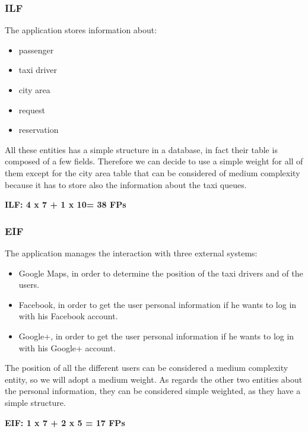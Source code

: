 		\subsubsection{ILF}
			The application stores information about:
			\begin{itemize}
				\item passenger
				\item taxi driver
				\item city area
				\item request
				\item reservation
			\end{itemize}
			All these entities has a simple structure in a database, in fact their table is composed of a few fields. Therefore we can decide to use a simple weight for all of them except for the city area table that can be considered of medium complexity because it has to store also the information about the taxi queues.
			\begin{center}
				\textbf{ILF: 4 x 7 + 1 x 10= 38 FPs}
			\end{center}
		\subsubsection{EIF}
			The application manages the interaction with three external systems:
			\begin{itemize}
				\item Google Maps, in order to determine the position of the taxi drivers and of the users.
				\item Facebook, in order to get the user personal information if he wants to log in with his Facebook account.
				\item Google+, in  order to get the user personal information if he wants to log in with his Google+ account.
			\end{itemize}
			The position of all the different users can be considered a medium complexity entity, so we will adopt a medium weight. As regards the other two entities about the personal information, they can be considered simple weighted, as they have a simple structure.\\
			\begin{center}
				\textbf{EIF: 1 x 7 + 2 x 5 = 17 FPs}
			\end{center}
